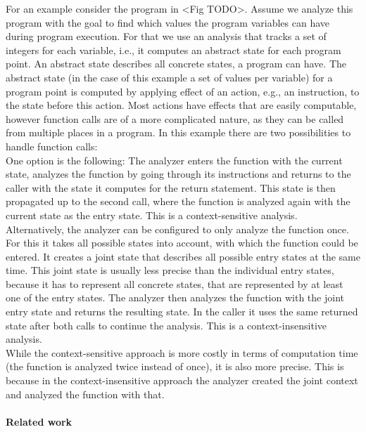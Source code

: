   For an example consider the program in <Fig TODO>. Assume we analyze this program with the goal to find which values the program variables can have during program execution. For that we use an analysis that tracks a set of integers for each variable, i.e., it computes an abstract state for each program point. An abstract state describes all concrete states, a program can have. The abstract state (in the case of this example a set of values per variable) for a program point is computed by applying effect of an action, e.g., an instruction, to the state before this action. Most actions have effects that are easily computable, however function calls are of a more complicated nature, as they can be called from multiple places in a program. In this example there are two possibilities to handle function calls:\\
  One option is the following: The analyzer enters the function with the current state, analyzes the function by going through its instructions and returns to the caller with the state it computes for the return statement. This state is then propagated up to the second call, where the function is analyzed again with the current state as the entry state. This is a context-sensitive analysis.\\
  Alternatively, the analyzer can be configured to only analyze the function once. For this it takes all possible states into account, with which the function could be entered. It creates a joint state that describes all possible entry states at the same time. This joint state is usually less precise than the individual entry states, because it has to represent all concrete states, that are represented by at least one of the entry states. The analyzer then analyzes the function with the joint entry state and returns the resulting state. In the caller it uses the same returned state after both calls to continue the analysis. This is a context-insensitive analysis.\\
  While the context-sensitive approach is more costly in terms of computation time (the function is analyzed twice instead of once), it is also more precise. This is because in the context-insensitive approach the analyzer created the joint context and analyzed the function with that. 

\paragraph{Related work}

